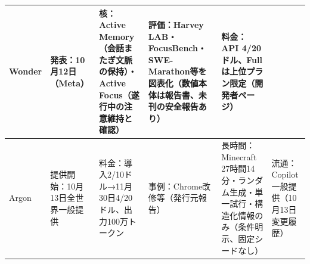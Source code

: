 \documentclass[lualatex,a4paper,10pt]{jlreq}
\begin{document}
{\centering\footnotesize
{}
\begin{tabularx}{0.96\linewidth}{@{}lXXXXX@{}}
\toprule
Wonder & 発表：10月12日（Meta） & 核：Active Memory（会話またぎ文脈の保持）・Active Focus（遂行中の注意維持と確認） & 評価：Harvey LAB・FocusBench・SWE-Marathon等を図表化（数値本体は報告書、未刊の安全報告あり） & 料金：API 4/20ドル、Fullは上位プラン限定（開発者ページ） \cite{B01,B62,B63,B02} \\
\midrule
Argon & 提供開始：10月13日全世界一般提供 & 料金：導入2/10ドル→11月30日4/20ドル、出力100万トークン & 事例：Chrome改修等（発行元報告） & 長時間：Minecraft 27時間14分・ランダム生成・単一試行・構造化情報のみ（条件明示、固定シードなし） & 流通：Copilot一般提供（10月13日変更履歴） \cite{B05,B65,B08,B04} \\
\bottomrule
\end{tabularx}
} %
\end{document}
